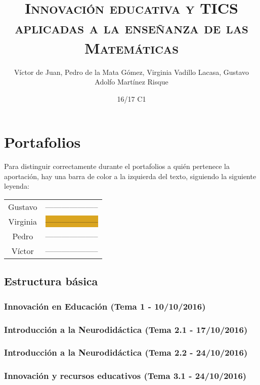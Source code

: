 \documentclass[palatino,nochap,miniheader]{apuntesURJC}
\title{\textsc{Innovación educativa y TICS aplicadas a la enseñanza de las Matemáticas}}
\author{Víctor de Juan,
Pedro de la Mata Gómez,
Virginia Vadillo Lacasa,
Gustavo Adolfo Martínez Risque}
\date{16/17 C1}
\newcommand{\guscolor}{OliveGreen}
\newcommand{\virgicolor}{Goldenrod}
\newcommand{\pedrocolor}{NavyBlue}
\newcommand{\victorcolor}{Bittersweet}
\begin{document}
\pagestyle{plain}
\maketitle

\tableofcontents
\newpage

\chapter{Portafolios}

Para distinguir correctamente durante el portafolios a quién pertenece la aportación, hay una barra de color a la izquierda del texto, siguiendo la siguiente leyenda:

\begin{table}[h!]
\centering
\begin{tabular}{|c|c|}
\hline
Gustavo & \colorbox{\guscolor}{--------------------}\\
Virginia & \colorbox{\virgicolor}{--------------------}\\
Pedro & \colorbox{\pedrocolor}{--------------------}\\
Víctor & \colorbox{\victorcolor}{--------------------}\\\hline
\end{tabular}
\end{table}

\section{Estructura básica}

\subsection{Innovación en Educación (Tema 1 - 10/10/2016)}


\subsection{Introducción a la Neurodidáctica (Tema 2.1 - 17/10/2016)}


\subsection{Introducción a la Neurodidáctica (Tema 2.2 - 24/10/2016)}


\subsection{Innovación y recursos educativos (Tema 3.1 - 24/10/2016)}

\end{document}
